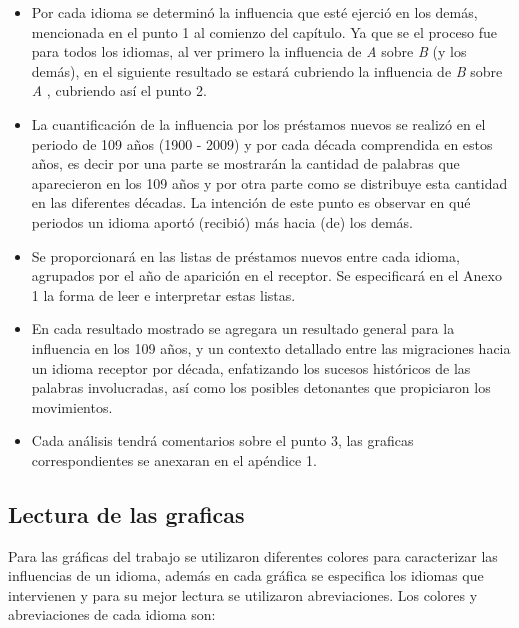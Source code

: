 \begin{itemize}
	
	\item Por cada idioma se determinó la influencia que esté ejerció en los demás,  mencionada en el punto 1 al comienzo del capítulo.   Ya que se el proceso fue para todos los idiomas,  al ver primero la influencia de \textit{A} sobre \textit{B}  (y los demás),  en el siguiente resultado se estará cubriendo la influencia  de \textit{B}  sobre \textit{A} , cubriendo así el punto 2. 
	
	\item La cuantificación de la influencia por los préstamos nuevos se realizó en el periodo de 109 años (1900 - 2009) y por cada década comprendida en estos años, es decir por una parte se mostrarán la cantidad de palabras que aparecieron en los 109 años y por otra parte como se distribuye esta cantidad en las diferentes décadas.  La intención de este punto es observar en qué periodos un idioma aportó (recibió) más  hacia (de) los demás.
	
	\item Se proporcionará en \cite{prestamos_nuevos} las listas  de préstamos nuevos entre cada idioma, agrupados por el año de aparición en el receptor.  Se especificará en el Anexo 1  la forma de leer e interpretar estas listas.
	
	\item En cada resultado mostrado se agregara un resultado general para la influencia en los 109 años, y un contexto detallado entre las migraciones hacia un idioma receptor por década,  enfatizando los sucesos históricos de las palabras involucradas, así como los posibles detonantes que propiciaron los movimientos. 
	
	\item Cada análisis tendrá comentarios sobre el punto 3,  las graficas correspondientes se anexaran en el apéndice 1.
	
	
\end{itemize}

\newpage

\subsection*{Lectura de las graficas}


Para las gráficas del trabajo se utilizaron diferentes colores para caracterizar las influencias de un idioma, además en cada gráfica se especifica los idiomas que intervienen y para su mejor lectura se utilizaron abreviaciones. Los colores y abreviaciones de cada idioma son:



